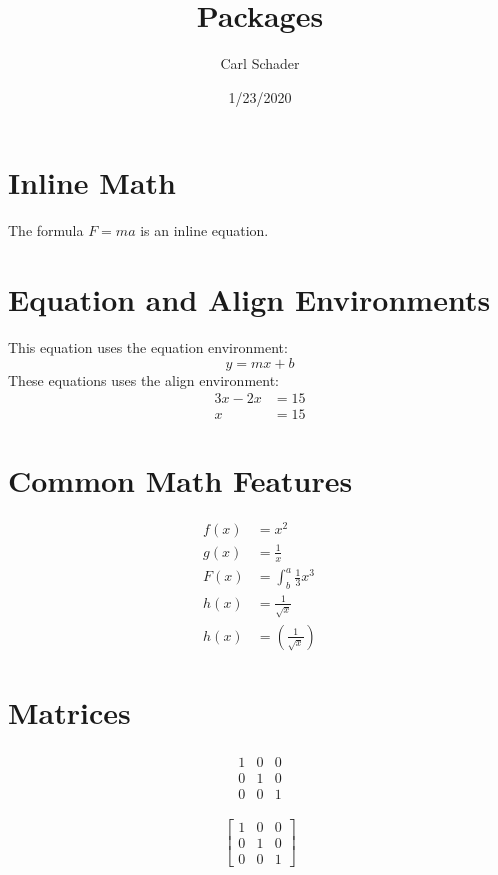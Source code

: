 \documentclass{article}
\title{Packages}
\date{1/23/2020}
\author{Carl Schader}
\begin{document}
	\maketitle

	\section{Inline Math} %
	The formula $F = ma$ is an inline equation.

	\section{Equation and Align Environments}
	This equation uses the equation environment:
	\begin{equation*}
		y = mx + b
	\end{equation*}
	These equations uses the align environment:
	\begin{align*} %
		3x - 2x &= 15\\ %
		x &= 15
	\end{align*}

	\section{Common Math Features}
	\begin{align*}
		f(x) &= x^2\\
		g(x) &= \frac{1}{x}\\
		F(x) &= \int^a_b \frac{1}{3}x^3\\
		h(x) &= \frac{1}{\sqrt{x}}\\
		h(x) &= \left(\frac{1}{\sqrt{x}}\right) %
	\end{align*}

	\section{Matrices} %
	\begin{align*}
		\begin{matrix} %
			1&0&0\\
			0&1&0\\
			0&0&1
		\end{matrix}
	\end{align*}

	\begin{equation*}
		\left[
		\begin{matrix}
				1 & 0 & 0\\
				0 & 1 & 0\\
				0 & 0 & 1
		\end{matrix}
		\right]
	\end{equation*}
\end{document}
